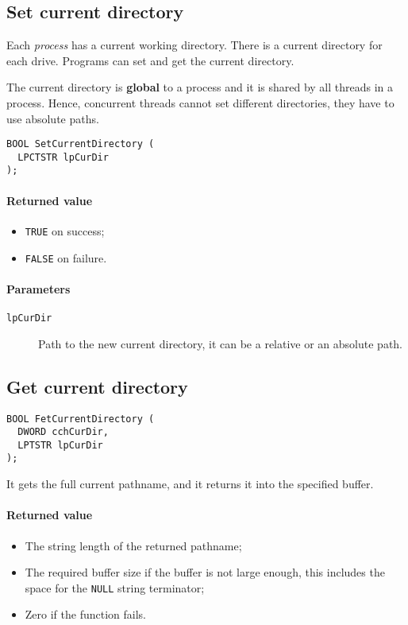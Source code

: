\subsection{Set current directory}
Each \emph{process} has a current working directory. There is a current directory for each drive. Programs can set and get the current directory.

The current directory is \textbf{global} to a process and it is shared by all threads in a process. Hence, concurrent threads cannot set different directories, they have to use absolute paths.

\begin{verbatim}
BOOL SetCurrentDirectory (
  LPCTSTR lpCurDir
);
\end{verbatim}

\paragraph{Returned value}
\begin{itemize}
\item \texttt{TRUE} on success;
\item \texttt{FALSE} on failure.
\end{itemize}

\paragraph{Parameters}
\begin{description}
\item [\texttt{lpCurDir}] Path to the new current directory, it can be a relative or an absolute path.
\end{description}

\subsection{Get current directory}
\begin{verbatim}
BOOL FetCurrentDirectory (
  DWORD cchCurDir,
  LPTSTR lpCurDir
);
\end{verbatim}

It gets the full current pathname, and it returns it into the specified buffer.

\paragraph{Returned value}
\begin{itemize}
\item The string length of the returned pathname;
\item The required buffer size if the buffer is not large enough, this includes the space for the \texttt{NULL} string terminator;
\item Zero if the function fails.
\end{itemize}

